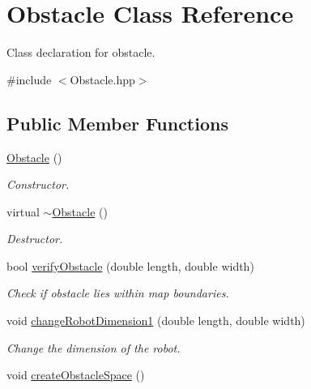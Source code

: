 \hypertarget{class_obstacle}{}\section{Obstacle Class Reference}
\label{class_obstacle}


Class declaration for obstacle.  




{\ttfamily \#include $<$Obstacle.\+hpp$>$}

\subsection*{Public Member Functions}
\begin{DoxyCompactItemize}
\item 
\mbox{\label{class_obstacle_a8f734072321fa06a7b7dae2d5f50f352}} 
\mbox{\hyperlink{class_obstacle_a8f734072321fa06a7b7dae2d5f50f352}{Obstacle}} ()
\begin{DoxyCompactList}\small\item\em Constructor. \end{DoxyCompactList}\item 
\mbox{\label{class_obstacle_af2f9cc9c6cff75dca0974fd5ac4f71a9}} 
virtual \mbox{\hyperlink{class_obstacle_af2f9cc9c6cff75dca0974fd5ac4f71a9}{$\sim$\+Obstacle}} ()
\begin{DoxyCompactList}\small\item\em Destructor. \end{DoxyCompactList}\item 
bool \mbox{\hyperlink{class_obstacle_ad0577b47e82c3df46d907df870549645}{verify\+Obstacle}} (double length, double width)
\begin{DoxyCompactList}\small\item\em Check if obstacle lies within map boundaries. \end{DoxyCompactList}\item 
void \mbox{\hyperlink{class_obstacle_a76a24f57c75fc401df706a8a1ed9a9fc}{change\+Robot\+Dimension1}} (double length, double width)
\begin{DoxyCompactList}\small\item\em Change the dimension of the robot. \end{DoxyCompactList}\item 
void \mbox{\hyperlink{class_obstacle_a40db91b4d2f9db3f8d04d20f285351c3}{create\+Obstacle\+Space}} ()

\end{DoxyCompactItemize}
